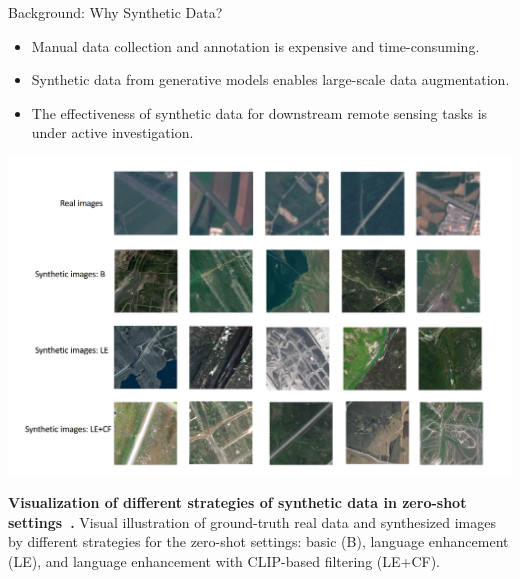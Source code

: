   
\begin{refsection}
  \begin{frame}{Background: Why Synthetic Data?}
    \begin{itemize}
      \item Manual data collection and annotation is expensive and time-consuming.
      \item Synthetic data from generative models enables large-scale data augmentation.
      \item The effectiveness of synthetic data for downstream remote sensing tasks is under active investigation.
    \end{itemize}
    \begin{minipage}{0.5\linewidth}
      \includegraphics[width=\linewidth]{figs/Visualization_of_different_strategies_of_synthetic_data_in_zeroshot_settings.png}
    \end{minipage}%
    \hfill
    \begin{minipage}{0.4\linewidth}
      \vspace{0.5em}
      {\scriptsize
      \textbf{Visualization of different strategies of synthetic data in zero-shot settings~\parencite{heSYNTHETICDATAGENERATIVE2022}.} Visual illustration of ground-truth real data and synthesized images by different strategies for the zero-shot settings: basic (B), language enhancement (LE), and language enhancement with CLIP-based filtering (LE+CF).
      }
    \end{minipage}
    \bottomleftrefs
  \end{frame}
  \end{refsection}
  
  
  
